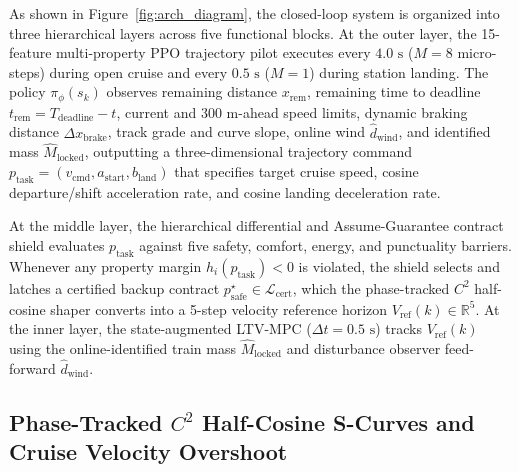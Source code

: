 \documentclass[10pt,a4paper]{article}
\begin{document}
As shown in Figure~\ref{fig:arch_diagram}, the closed-loop system is organized into three hierarchical layers across five functional blocks. At the outer layer, the 15-feature multi-property PPO trajectory pilot executes every $4.0\text{ s}$ ($M=8$ micro-steps) during open cruise and every $0.5\text{ s}$ ($M=1$) during station landing. The policy $\pi_\phi(s_k)$ observes remaining distance $x_{\text{rem}}$, remaining time to deadline $t_{\text{rem}} = T_{\text{deadline}} - t$, current and $300\text{ m}$-ahead speed limits, dynamic braking distance $\Delta x_{\text{brake}}$, track grade and curve slope, online wind $\hat{d}_{\text{wind}}$, and identified mass $\hat{M}_{\text{locked}}$, outputting a three-dimensional trajectory command $p_{\text{task}} = (v_{\text{cmd}}, a_{\text{start}}, b_{\text{land}})$ that specifies target cruise speed, cosine departure/shift acceleration rate, and cosine landing deceleration rate.

At the middle layer, the hierarchical differential and Assume-Guarantee contract shield evaluates $p_{\text{task}}$ against five safety, comfort, energy, and punctuality barriers. Whenever any property margin $h_i(p_{\text{task}}) < 0$ is violated, the shield selects and latches a certified backup contract $p_{\text{safe}}^\star \in \mathcal{L}_{\text{cert}}$, which the phase-tracked $C^2$ half-cosine shaper converts into a 5-step velocity reference horizon $V_{\text{ref}}(k) \in \mathbb{R}^5$. At the inner layer, the state-augmented LTV-MPC ($\Delta t = 0.5\text{ s}$) tracks $V_{\text{ref}}(k)$ using the online-identified train mass $\hat{M}_{\text{locked}}$ and disturbance observer feed-forward $\hat{d}_{\text{wind}}$.

\subsection{Phase-Tracked \texorpdfstring{$C^2$}{C2} Half-Cosine S-Curves and Cruise Velocity Overshoot}
\end{document}
